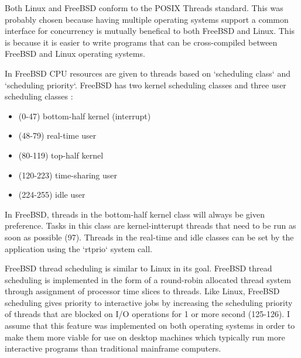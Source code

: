 \documentclass[onecolumn,10pt]{IEEETran}
\begin{document}
	Both Linux and FreeBSD conform to the POSIX Threads standard.  This was probably chosen because  having multiple operating systems support a common interface for concurrency is mutually benefical to both FreeBSD and Linux.  This is because it is easier to write programs that can be cross-compiled between FreeBSD and Linux operating systems.

	In FreeBSD CPU resources are given to threads based on `scheduling class` and `scheduling priority`.  FreeBSD has two kernel scheduling classes and three user scheduling classes \cite{freebsd} :
		\begin{itemize}
			\item (0-47) bottom-half kernel (interrupt)
			\item (48-79) real-time user
			\item (80-119) top-half kernel
			\item (120-223) time-sharing user
			\item (224-255) idle user
		\end{itemize}

	In FreeBSD, threads in the bottom-half kernel class will always be given preference.  Tasks in this class are kernel-intterupt threads that need to be run as soon as possible (97).  Threads in the real-time and idle classes can be set by the application using the `rtprio` system call.

	FreeBSD thread scheduling is similar to Linux in its goal.  FreeBSD thread scheduling is implemented in the form of a round-robin allocated thread system through assignment of processor time slices to threads.  Like Linux, FreeBSD scheduling gives priority to interactive jobs by increasing the scheduling priority of threads that are blocked on I/O operations for 1 or more second (125-126).  
	I assume that this feature was implemented on both operating systems in order to make them more viable for use on desktop machines which typically run more interactive programs than traditional mainframe computers.
\end{document}
